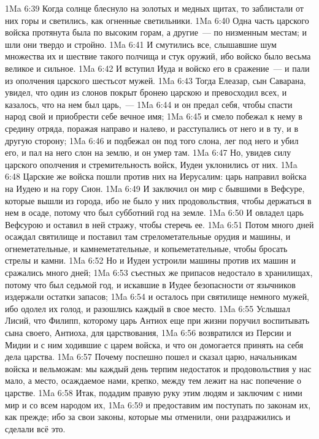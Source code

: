 \vs 1Ma 6:39 Когда солнце блеснуло на золотых и медных щитах, то заблистали от них горы и светились, как огненные светильники.
\vs 1Ma 6:40 Одна часть царского войска протянута была по высоким горам, а другие~--- по низменным местам; и шли они твердо и стройно.
\vs 1Ma 6:41 И смутились все, слышавшие шум множества их и шествие такого полчища и стук оружий, ибо войско было весьма великое и сильное.
\vs 1Ma 6:42 И вступил Иуда и войско его в сражение~--- и пали из ополчения царского шестьсот мужей.
\vs 1Ma 6:43 Тогда Елеазар, сын Саварана, увидел, что один из слонов покрыт бронею царскою и превосходил всех, и казалось, что на нем был царь,~---
\vs 1Ma 6:44 и он предал себя, чтобы спасти народ свой и приобрести себе вечное имя;
\vs 1Ma 6:45 и смело побежал к нему в средину отряда, поражая направо и налево, и расступались от него и в ту, и в другую сторону;
\vs 1Ma 6:46 и подбежал он под того слона, лег под него и убил его, и пал на него слон на землю, и он умер там.
\vs 1Ma 6:47 Но, увидев силу царского ополчения и стремительность войск, Иудеи уклонились от них.
\vs 1Ma 6:48 Царские же войска пошли против них на Иерусалим: царь направил войска на Иудею и на гору Сион.
\vs 1Ma 6:49 И заключил он мир с бывшими в Вефсуре, которые вышли из города, ибо не было у них продовольствия, чтобы держаться в нем в осаде, потому что был субботний год на земле.
\vs 1Ma 6:50 И овладел царь Вефсурою и оставил в ней стражу, чтобы стеречь ее.
\vs 1Ma 6:51 Потом много дней осаждал святилище и поставил там стрелометательные орудия и машины, и огнеметательные, и камнеметательные, и копьеметательные, чтобы бросать стрелы и камни.
\vs 1Ma 6:52 Но и Иудеи устроили машины против их машин и сражались много дней;
\vs 1Ma 6:53 съестных же припасов недостало в хранилищах, потому что был седьмой год, и искавшие в Иудее безопасности от язычников издержали остатки запасов;
\vs 1Ma 6:54 и осталось при святилище немного мужей, ибо одолел их голод, и разошлись каждый в свое место.
\rsbpar\vs 1Ma 6:55 Услышал Лисий, что Филипп, которому царь Антиох еще при жизни поручил воспитывать сына своего, Антиоха, для царствования,
\vs 1Ma 6:56 возвратился из Персии и Мидии и с ним ходившие с царем войска, и что он домогается принять на себя дела царства.
\vs 1Ma 6:57 Почему поспешно пошел и сказал царю, начальникам войска и вельможам: мы каждый день терпим недостаток и продовольствия у нас мало, а место, осаждаемое нами, крепко, между тем лежит на нас попечение о царстве.
\vs 1Ma 6:58 Итак, подадим правую руку этим людям и заключим с ними мир и со всем народом их,
\vs 1Ma 6:59 и предоставим им поступать по законам их, как прежде; ибо за свои законы, которые мы отменили, они раздражились и сделали всё это.
